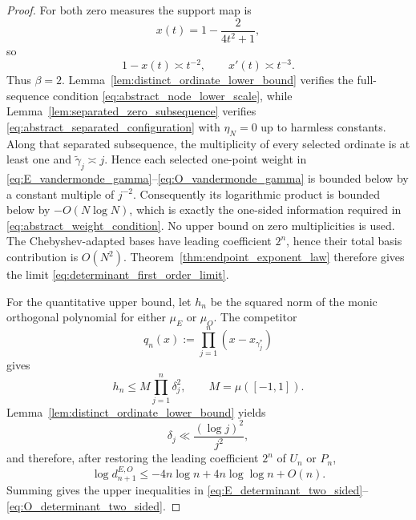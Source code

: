 \documentclass[preprint,12pt]{elsarticle}
\numberwithin{equation}{section}
\theoremstyle{plain}
\theoremstyle{definition}
\theoremstyle{remark}
\begin{document}
\begin{proof}
For both zero measures the support map is
\begin{equation}
x(t)=1-\frac{2}{4t^2+1},
\label{eq:x_of_t_decay}
\end{equation}
so
\begin{equation}
1-x(t)\asymp t^{-2},
\qquad
x'(t)\asymp t^{-3}.
\label{eq:zeta_endpoint_beta_two}
\end{equation}
Thus $\beta=2$. Lemma~\ref{lem:distinct_ordinate_lower_bound} verifies the full-sequence condition \eqref{eq:abstract_node_lower_scale}, while Lemma~\ref{lem:separated_zero_subsequence} verifies \eqref{eq:abstract_separated_configuration} with $\eta_N=0$ up to harmless constants. Along that separated subsequence, the multiplicity of every selected ordinate is at least one and \(\widetilde\gamma_j\asymp j\).  Hence each selected one-point weight in \eqref{eq:E_vandermonde_gamma}--\eqref{eq:O_vandermonde_gamma} is bounded below by a constant multiple of \(j^{-2}\).  Consequently its logarithmic product is bounded below by \(-O(N\log N)\), which is exactly the one-sided information required in \eqref{eq:abstract_weight_condition}.  No upper bound on zero multiplicities is used. The Chebyshev-adapted bases have leading coefficient $2^n$, hence their total basis contribution is $O(N^2)$. Theorem~\ref{thm:endpoint_exponent_law} therefore gives the limit \eqref{eq:determinant_first_order_limit}.

For the quantitative upper bound, let $h_n$ be the squared norm of the monic orthogonal polynomial for either $\mu_E$ or $\mu_O$. The competitor
\begin{equation}
q_n(x):=\prod_{j=1}^{n}(x-x_{\gamma_j^*})
\label{eq:extremal_competitor}
\end{equation}
gives
\begin{equation}
h_n\le M\prod_{j=1}^{n}\delta_j^2,
\qquad M=\mu([-1,1]).
\label{eq:monic_norm_upper_bound}
\end{equation}
Lemma~\ref{lem:distinct_ordinate_lower_bound} yields
\begin{equation}
\delta_j\ll\frac{(\log j)^2}{j^2},
\label{eq:delta_upper_RVM}
\end{equation}
and therefore, after restoring the leading coefficient $2^n$ of $U_n$ or $P_n$,
\begin{equation}
\log d_{n+1}^{E,O}
\le -4n\log n+4n\log\log n+O(n).
\label{eq:pivot_upper_asymptotic}
\end{equation}
Summing gives the upper inequalities in \eqref{eq:E_determinant_two_sided}--\eqref{eq:O_determinant_two_sided}.


\end{proof}
\end{document}
